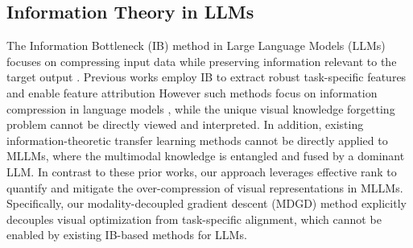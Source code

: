 \subsection{Information Theory in LLMs}
The Information Bottleneck (IB) method \cite{tishby2000information} in Large Language Models (LLMs) 
focuses on compressing input data while preserving information relevant to the target output \cite{deletang2023language,valmeekam2023llmzip,wei2024diff,wu2022context}. 
Previous works employ IB to extract robust task-specific features \cite{zhang2022improving,wu2024infoprompt} and enable feature attribution \cite{li2022explanation,jiang2020inserting}
However such methods focus on information compression in language models \cite{yang2025exploring}, while the unique visual knowledge forgetting problem cannot be directly viewed and interpreted.
In addition, existing information-theoretic transfer learning methods \cite{tseng2024semantic,wu2024infoprompt,ling2024convergence} cannot be directly applied to MLLMs, 
where the multimodal knowledge is entangled and fused by a dominant LLM. 
In contrast to these prior works, our approach leverages effective rank to quantify and mitigate the over-compression of visual representations in MLLMs. 
Specifically, our modality-decoupled gradient descent (MDGD) method explicitly decouples visual optimization from task-specific alignment, which cannot be enabled by existing IB-based methods for LLMs.












